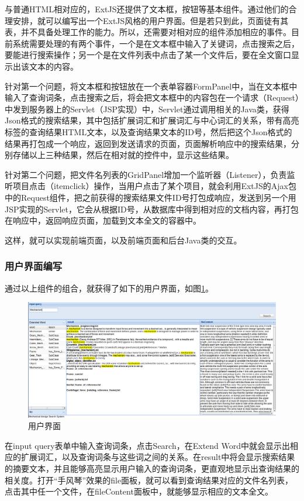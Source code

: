 \documentclass[12pt,a4paper]{article}
\begin{document}
	与普通HTML相对应的，ExtJS还提供了文本框，按钮等基本组件。通过他们的合理安排，就可以编写出一个ExtJS风格的用户界面。但是若只到此，页面徒有其表，并不具备处理工作的能力。所以，还需要对相对应的组件添加相应的事件。目前系统需要处理的有两个事件，一个是在文本框中输入了关键词，点击搜索之后，要能进行搜索操作；另一个是在文件列表中点击了某一个文件后，要在全文窗口显示出该文本的内容。
	
	针对第一个问题，将文本框和按钮放在一个表单容器FormPanel中，当在文本框中输入了查询词条，点击搜索之后，将会把文本框中的内容包在一个请求（Request）中发到服务器上的Servlet（JSP实现）中，Servlet通过调用相关的Java类，获得Json格式的搜索结果，其中包括扩展词汇和扩展词汇与中心词汇的关系，带有高亮标签的查询结果HTML文本，以及查询结果文本的ID号，然后把这个Json格式的结果再打包成一个响应，返回到发送请求的页面，页面解析响应中的搜索结果，分别存储以上三种结果，然后在相对就的控件中，显示这些结果。
	
	针对第二个问题，把文件名列表的GridPanel增加一个监听器（Listener），负责监听项目点击（itemclick）操作，当用户点击了某个项目，就会利用ExtJS的Ajax包中的Request组件，把之前获得的搜索结果文件ID号打包成响应，发送到另一个用JSP实现的Servlet，它会从根据ID号，从数据库中得到相对应的文档内容，再打包在响应中，返回响应页面，加载到文本全文的容器中。
	
	这样，就可以实现前端页面，以及前端页面和后台Java类的交互。	

		\subsubsection{用户界面编写}
		通过以上组件的组合，就获得了如下的用户界面，如图\ref{fig:用户界面}。
	\begin{figure}[htbp] 
	\centering\includegraphics[width=6in]{fig/GUI.png} 
	\caption{用户界面}\label{fig:用户界面} 
	\end{figure} 
		
	在input query表单中输入查询词条，点击Search，在Extend Word中就会显示出相应的扩展词汇，以及查询词条与这些词之间的关系。在result中将会显示搜索结果的摘要文本，并且能够高亮显示用户输入的查询词条，更直观地显示出查询结果的相关度。打开“手风琴”效果的file面板，就可以看到查询结果对应的文件名列表，点击其中任一个文件，在fileContent面板中，就能够显示相应的文本全文。
	
\end{document}
